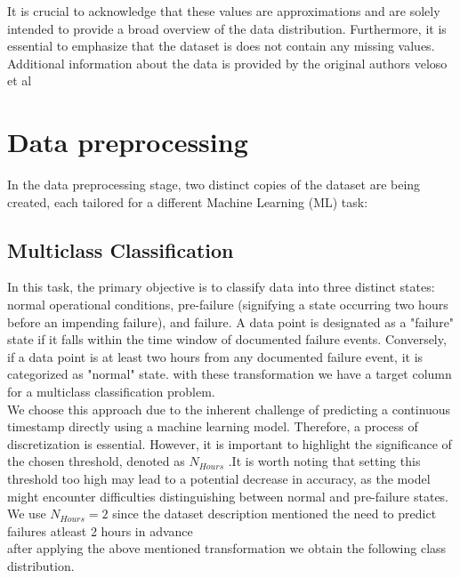 \documentclass{article}
\begin{document}
It is crucial to acknowledge that these values are approximations and are solely intended to provide a broad overview of the data distribution. Furthermore, it is essential to emphasize that the dataset is does not contain any missing values. Additional information about the data is provided by the original authors veloso et al\cite{Veloso2022}

\newpage

\section{Data preprocessing}

In the data preprocessing stage, two distinct copies of the dataset are being created, each tailored for a different Machine Learning (ML) task:

\subsection{Multiclass Classification} 

In this task, the primary objective is to classify data into three distinct states: normal operational conditions, pre-failure (signifying a state occurring two hours before an impending failure), and failure. A data point is designated as a "failure" state if it falls within the time window of documented failure events. Conversely, if a data point is at least two hours from any documented failure event, it is categorized as "normal" state. with these transformation we have a target column for a multiclass classification problem.\\ 

We choose this approach due to the inherent challenge of predicting a continuous timestamp directly using a machine learning model. Therefore, a process of discretization is essential. However, it is important to highlight the significance of the chosen threshold, denoted as $N_{Hours}$ .It is worth noting that setting this threshold too high may lead to a potential decrease in accuracy, as the model might encounter difficulties distinguishing between normal and pre-failure states. We use $N_{Hours} = 2$ since the dataset description mentioned the need to predict failures atleast 2 hours in advance \\

after applying the above mentioned transformation we obtain the following class distribution. \\
\end{document}
